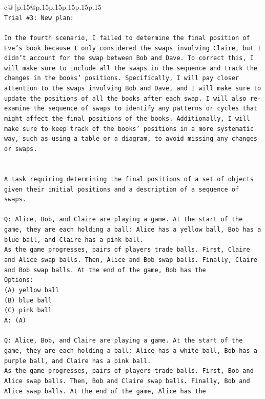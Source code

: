 \documentclass{article}
\begin{document}
{\begin{supertabular}{c@{$\;$}|p{.15\linewidth}@{}p{.15\linewidth}p{.15\linewidth}p{.15\linewidth}p{.15\linewidth}p{.15\linewidth}}
{{{\\ 
\texttt{Trial \#3: New plan: } \\
\\ 
\texttt{In the fourth scenario, I failed to determine the final position of Eve's book because I only considered the swaps involving Claire, but I didn't account for the swap between Bob and Dave. To correct this, I will make sure to include all the swaps in the sequence and track the changes in the books' positions. Specifically, I will pay closer attention to the swaps involving Bob and Dave, and I will make sure to update the positions of all the books after each swap. I will also re{-}examine the sequence of swaps to identify any patterns or cycles that might affect the final positions of the books. Additionally, I will make sure to keep track of the books' positions in a more systematic way, such as using a table or a diagram, to avoid missing any changes or swaps.} \\
\\ 
\\ 
\texttt{A task requiring determining the final positions of a set of objects given their initial positions and a description of a sequence of swaps.} \\
\\ 
\texttt{Q: Alice, Bob, and Claire are playing a game. At the start of the game, they are each holding a ball: Alice has a yellow ball, Bob has a blue ball, and Claire has a pink ball.} \\
\texttt{As the game progresses, pairs of players trade balls. First, Claire and Alice swap balls. Then, Alice and Bob swap balls. Finally, Claire and Bob swap balls. At the end of the game, Bob has the} \\
\texttt{Options:} \\
\texttt{(A) yellow ball} \\
\texttt{(B) blue ball} \\
\texttt{(C) pink ball} \\
\texttt{A: (A)} \\
\\ 
\texttt{Q: Alice, Bob, and Claire are playing a game. At the start of the game, they are each holding a ball: Alice has a white ball, Bob has a purple ball, and Claire has a pink ball.} \\
\texttt{As the game progresses, pairs of players trade balls. First, Bob and Alice swap balls. Then, Bob and Claire swap balls. Finally, Bob and Alice swap balls. At the end of the game, Alice has the} \\
}}}
\end{supertabular}}
\end{document}
